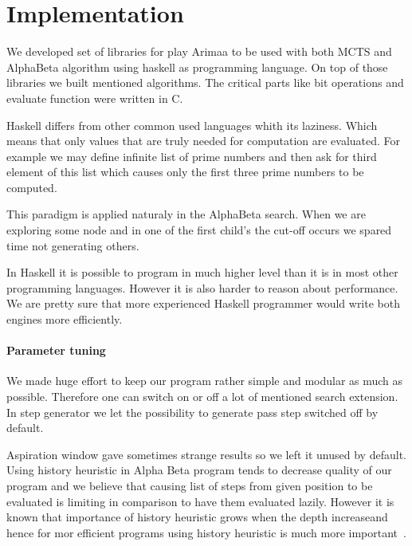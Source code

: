 \chapter{Implementation}
We developed set of libraries for play Arimaa to be used with both MCTS and
AlphaBeta algorithm using haskell as programming language. On top of those
libraries we built mentioned algorithms. The critical parts like bit operations
and evaluate function were written in C.

Haskell differs from other common used languages whith its laziness. Which means
that only values that are truly needed for computation are evaluated. For
example we may define infinite list of prime numbers and then ask for third
element of this list which causes only the first three prime numbers to be
computed.

This paradigm is applied naturaly in the AlphaBeta search. When we are
exploring some node and in one of the first child's the cut-off occurs we
spared time not generating others.


In Haskell it is possible to program in much higher level than it is in most
other programming languages. However it is also harder to reason about
performance. We are pretty sure that more experienced Haskell programmer would
write both engines more efficiently.

\subsubsection{Parameter tuning}

We made huge effort to keep our program rather simple and modular as much as
possible. Therefore one can switch on or off a lot of mentioned search
extension. In step generator we let the possibility to generate pass step
switched off by default.

Aspiration window gave sometimes strange results so we left it unused by default.
Using history heuristic in Alpha Beta program tends to decrease quality of our
program and we believe that causing list of steps from given position to be
evaluated is limiting in comparison to have them evaluated lazily. However it
is known that importance of history heuristic grows when the depth increaseand
hence for mor efficient programs using history heuristic is much more
important~\cite{ZHONG}.

